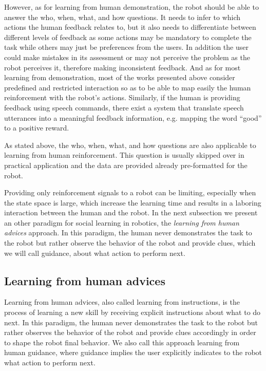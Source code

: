 However, as for learning from human demonstration, the robot should be able to answer the who, when, what, and how questions. It needs to infer to which actions the human feedback relates to, but it also needs to differentiate between different levels of feedback as some actions may be mandatory to complete the task while others may just be preferences from the users. In addition the user could make mistakes in its assessment or may not perceive the problem as the robot perceives it, therefore making inconsistent feedback. And as for most learning from demonstration, most of the works presented above consider predefined and restricted interaction so as to be able to map easily the human reinforcement with the robot's actions. Similarly, if the human is providing feedback using speech commands, there exist a system that translate speech utterances into a meaningful feedback information, e.g. mapping the word ``good'' to a positive reward.

\transition

As stated above, the who, when, what, and how questions are also applicable to learning from human reinforcement. This question is usually skipped over in practical application and the data are provided already pre-formatted for the robot.

Providing only reinforcement signals to a robot can be limiting, especially when the state space is large, which increase the learning time and results in a laboring interaction between the human and the robot. In the next subsection we present an other paradigm for social learning in robotics, the \emph{learning from human advices} approach. In this paradigm, the human never demonstrates the task to the robot but rather observe the behavior of the robot and provide clues, which we will call guidance, about what action to perform next.

\subsection{Learning from human advices}

Learning from human advices, also called learning from instructions, is the process of learning a new skill by receiving explicit instructions about what to do next. In this paradigm, the human never demonstrates the task to the robot but rather observes the behavior of the robot and provide clues accordingly in order to shape the robot final behavior. We also call this approach learning from human guidance, where guidance implies the user explicitly indicates to the robot what action to perform next.


